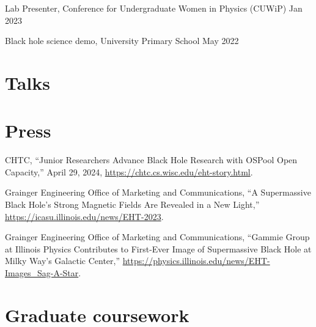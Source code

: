 \documentclass[12pt]{article}
\begin{document}
Lab Presenter, Conference for Undergraduate Women in Physics (CUWiP) \hfill Jan 2023\\

Black hole science demo, University Primary School \hfill May 2022\\


\ifdefined\withtalks{}
\section*{Talks}

\else\fi

\ifdefined\withpress{}
\section*{Press}
CHTC, “Junior Researchers Advance Black Hole Research with OSPool Open Capacity,” April 29, 2024, \href{https://chtc.cs.wisc.edu/eht-story.html}{https://chtc.cs.wisc.edu/eht-story.html}.

Grainger Engineering Office of Marketing and Communications, “A Supermassive Black Hole’s Strong Magnetic Fields Are Revealed in a New Light,” \href{https://icasu.illinois.edu/news/EHT-2023}{https://icasu.illinois.edu/news/EHT-2023}.

Grainger Engineering Office of Marketing and Communications, “Gammie Group at Illinois Physics Contributes to First-Ever Image of Supermassive Black Hole at Milky Way’s Galactic Center,” \href{https://physics.illinois.edu/news/EHT-Images\_Sag-A-Star}{https://physics.illinois.edu/news/EHT-Images\_Sag-A-Star}.

\else\fi

\ifdefined\withcourses{}
\section*{Graduate coursework}

\else\fi
\end{document}
